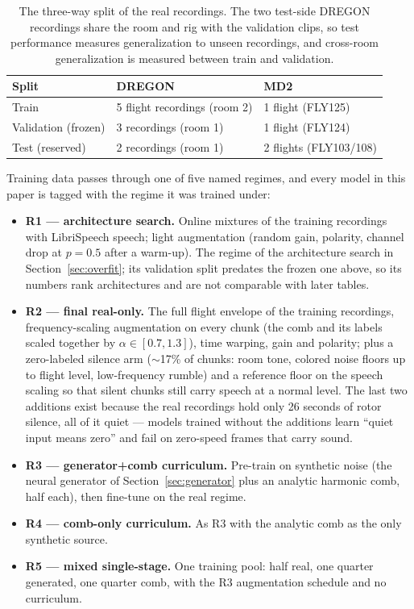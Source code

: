 \documentclass[journal]{IEEEtran}
\begin{document}
\begin{table}[t]
\centering
\small
\begin{tabular}{lll}
\toprule
Split & DREGON & MD2 \\
\midrule
Train & 5 flight recordings (room 2) & 1 flight (FLY125) \\
Validation (frozen) & 3 recordings (room 1) & 1 flight (FLY124) \\
Test (reserved) & 2 recordings (room 1) & 2 flights (FLY103/108) \\
\bottomrule
\end{tabular}
\caption{The three-way split of the real recordings. The two test-side
DREGON recordings share the room and rig with the validation clips, so
test performance measures generalization to unseen recordings, and
cross-room generalization is measured between train and validation.}
\label{tab:splits}
\end{table}

Training data passes through one of five named regimes, and every model in
this paper is tagged with the regime it was trained under:

\begin{itemize}
\item \textbf{R1 — architecture search.} Online mixtures of the training
  recordings with LibriSpeech speech; light augmentation (random gain,
  polarity, channel drop at $p{=}0.5$ after a warm-up). The regime of the
  architecture search in Section~\ref{sec:overfit}; its validation split
  predates the frozen one above, so its numbers rank architectures and are
  not comparable with later tables.
\item \textbf{R2 — final real-only.} The full flight envelope of the
  training recordings, frequency-scaling augmentation on every chunk
  (the comb and its labels scaled together by $\alpha \in [0.7, 1.3]$),
  time warping, gain and polarity; plus a zero-labeled silence arm
  ($\sim$17\% of chunks: room tone, colored noise floors up to flight
  level, low-frequency rumble) and a reference floor on the speech
  scaling so that silent chunks still carry speech at a normal level.
  The last two additions exist because the real recordings hold only
  26 seconds of rotor silence, all of it quiet — models trained without
  the additions learn ``quiet input means zero'' and fail on zero-speed
  frames that carry sound.
\item \textbf{R3 — generator+comb curriculum.} Pre-train on synthetic
  noise (the neural generator of Section~\ref{sec:generator} plus an
  analytic harmonic comb, half each), then fine-tune on the real regime.
\item \textbf{R4 — comb-only curriculum.} As R3 with the analytic comb as
  the only synthetic source.
\item \textbf{R5 — mixed single-stage.} One training pool: half real,
  one quarter generated, one quarter comb, with the R3 augmentation
  schedule and no curriculum.
\end{itemize}
\end{document}
